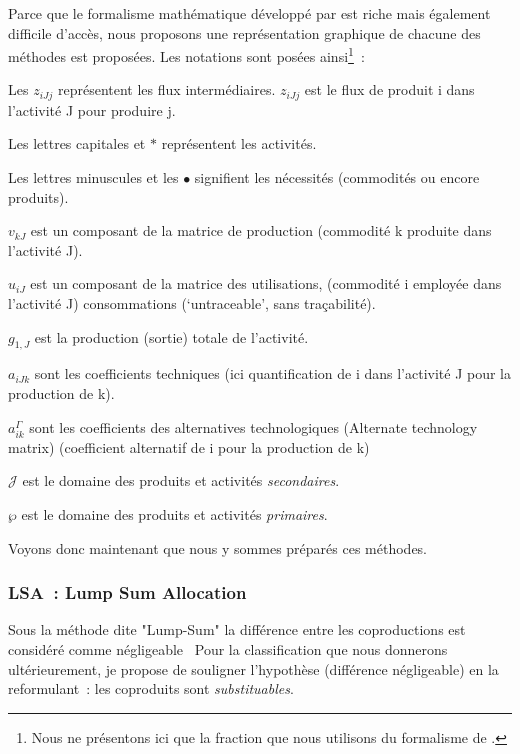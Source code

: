 Parce que le formalisme mathématique développé par \citeauthor{majeau-bettez_unified_2014} est riche mais également difficile d'accès, nous proposons une représentation graphique de chacune des méthodes est proposées.
Les notations sont posées ainsi\footnote{Nous ne présentons ici que la fraction que nous utilisons du formalisme de \citeauthor{majeau-bettez_unified_2014}.}~:
\begin{description}
\item Les $z_{iJj}$ représentent les flux intermédiaires. $z_{iJj}$ est le flux de produit i dans l'activité J pour produire j.
\item Les lettres capitales et $\ast$ représentent les activités.
\item Les lettres minuscules et les $\bullet$ signifient les nécessités (commodités ou encore produits).
\item $v_{kJ}$ est un composant de la matrice de production (commodité k produite dans l'activité J).
\item $u_{iJ}$ est un composant de la matrice des utilisations, (commodité i employée dans l'activité J) consommations (`untraceable', sans traçabilité).
\item $g_{1,J}$ est la production (sortie) totale de l'activité.
\item ${a}_{iJk}$ sont les coefficients techniques (ici quantification de i dans l'activité J pour la production de k).
\item $a^{\Gamma}_{ik}$ sont les coefficients des alternatives technologiques (Alternate technology matrix) (coefficient alternatif de i pour la production de k)
\item $\mathcal{J}$ est le domaine des produits et activités \emph{secondaires}.
\item $\wp$ est le domaine des produits et activités \emph{primaires}.
\end{description}


Voyons donc maintenant que nous y sommes préparés ces méthodes.

\subsubsection{LSA~: Lump Sum Allocation}
Sous la méthode dite "Lump-Sum" la différence entre les coproductions est considéré comme négligeable~\cite[LSA]{majeau-bettez_unified_2014}
Pour la classification que nous donnerons ultérieurement, je propose de souligner l'hypothèse (différence négligeable) en la reformulant~: les coproduits sont \emph{substituables}.

